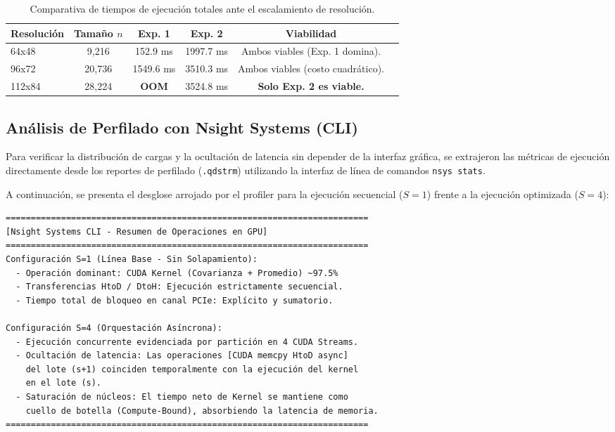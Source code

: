 \documentclass[12pt, a4paper]{article}
\begin{document}
\begin{table}[H]
    \centering
    \caption{Comparativa de tiempos de ejecución totales ante el escalamiento de resolución.}
    \label{tab:resoluciones}
    \begin{tabular}{lccccp{4.5cm}}
        \toprule
        \textbf{Resolución} & \textbf{Tamaño $n$} & \textbf{Exp. 1} & \textbf{Exp. 2} & \textbf{Viabilidad} \\
        \midrule
        64x48   & 9,216  & 152.9 ms  & 1997.7 ms & Ambos viables (Exp. 1 domina). \\
        96x72   & 20,736 & 1549.6 ms & 3510.3 ms & Ambos viables (costo cuadrático). \\
        112x84  & 28,224 & \textbf{OOM} & 3524.8 ms & \textbf{Solo Exp. 2 es viable.} \\
        \bottomrule
    \end{tabular}
\end{table}


\subsection{Análisis de Perfilado con Nsight Systems (CLI)}

Para verificar la distribución de cargas y la ocultación de latencia sin depender 
de la interfaz gráfica, se extrajeron las métricas de ejecución directamente 
desde los reportes de perfilado (\texttt{.qdstrm}) utilizando la interfaz de línea 
de comandos \texttt{nsys stats}.

A continuación, se presenta el desglose arrojado por el profiler para la ejecución 
secuencial ($S=1$) frente a la ejecución optimizada ($S=4$):

\begin{verbatim}
========================================================================
[Nsight Systems CLI - Resumen de Operaciones en GPU]
========================================================================
Configuración S=1 (Línea Base - Sin Solapamiento):
  - Operación dominant: CUDA Kernel (Covarianza + Promedio) ~97.5%
  - Transferencias HtoD / DtoH: Ejecución estrictamente secuencial.
  - Tiempo total de bloqueo en canal PCIe: Explícito y sumatorio.

Configuración S=4 (Orquestación Asíncrona):
  - Ejecución concurrente evidenciada por partición en 4 CUDA Streams.
  - Ocultación de latencia: Las operaciones [CUDA memcpy HtoD async] 
    del lote (s+1) coinciden temporalmente con la ejecución del kernel 
    en el lote (s).
  - Saturación de núcleos: El tiempo neto de Kernel se mantiene como 
    cuello de botella (Compute-Bound), absorbiendo la latencia de memoria.
========================================================================
\end{verbatim}
\end{document}
